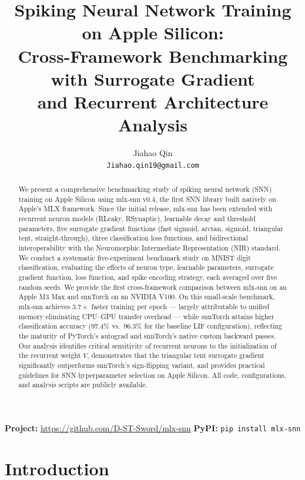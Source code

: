 \documentclass[11pt]{article}
\title{\textbf{Spiking Neural Network Training on Apple Silicon:\\Cross-Framework Benchmarking with Surrogate Gradient\\and Recurrent Architecture Analysis}}
\author{
    Jiahao Qin \\
    \texttt{Jiahao.qin19@gmail.com}
}
\date{}
\begin{document}
\maketitle

\begin{abstract}
We present a comprehensive benchmarking study of spiking neural network (SNN) training on Apple Silicon using mlx-snn v0.4, the first SNN library built natively on Apple's MLX framework. Since the initial release, mlx-snn has been extended with recurrent neuron models (RLeaky, RSynaptic), learnable decay and threshold parameters, five surrogate gradient functions (fast sigmoid, arctan, sigmoid, triangular tent, straight-through), three classification loss functions, and bidirectional interoperability with the Neuromorphic Intermediate Representation (NIR) standard. We conduct a systematic five-experiment benchmark study on MNIST digit classification, evaluating the effects of neuron type, learnable parameters, surrogate gradient function, loss function, and spike encoding strategy, each averaged over five random seeds. We provide the first cross-framework comparison between mlx-snn on an Apple M3 Max and snnTorch on an NVIDIA V100. On this small-scale benchmark, mlx-snn achieves $3.7\times$ faster training per epoch --- largely attributable to unified memory eliminating CPU--GPU transfer overhead --- while snnTorch attains higher classification accuracy ($97.4\%$ vs.\ $96.3\%$ for the baseline LIF configuration), reflecting the maturity of PyTorch's autograd and snnTorch's native custom backward passes. Our analysis identifies critical sensitivity of recurrent neurons to the initialization of the recurrent weight $V$, demonstrates that the triangular tent surrogate gradient significantly outperforms snnTorch's sign-flipping variant, and provides practical guidelines for SNN hyperparameter selection on Apple Silicon. All code, configurations, and analysis scripts are publicly available.
\end{abstract}

\noindent\textbf{Project:} \url{https://github.com/D-ST-Sword/mlx-snn} \quad \textbf{PyPI:} \texttt{pip install mlx-snn}

\section{Introduction}
\end{document}
